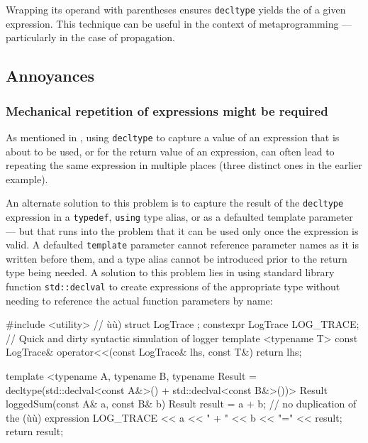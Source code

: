\noindent Wrapping its operand with parentheses ensures \lstinline!decltype! yields
the  of a given expression. This technique can be
useful in the context of metaprogramming --- particularly in the case of
 propagation.

\subsection[Annoyances]{Annoyances}\label{annoyances-decltype}

\subsubsection{Mechanical repetition of expressions might be required}\label{decltype-mechanical}

As mentioned in
,
using \lstinline!decltype! to capture a value of an expression that is about to be used, or for the return value of an expression, can often lead to repeating the same expression in multiple places (three distinct ones in the earlier example).

An alternate solution to this problem is to capture the result of the \lstinline!decltype! expression in a \lstinline!typedef!, \lstinline!using! type alias, or as a defaulted template parameter --- but that runs into the problem that it can be used only once the expression is valid.  A defaulted \lstinline!template! parameter cannot reference parameter names as it is written before them, and a type alias cannot be introduced prior to the return type being needed.  A solution to this problem lies in using standard library function \lstinline!std::declval! to create expressions of the appropriate type without needing to reference the actual function parameters by name:

\begin{emcppshiddenlisting}[emcppsbatch=e11]
#include <utility>  // ù{}ù)
struct LogTrace {};  
constexpr LogTrace LOG_TRACE; // Quick and dirty syntactic simulation of logger
template <typename T>
const LogTrace& operator<<(const LogTrace& lhs, const T&) { return lhs; }
\end{emcppshiddenlisting}
\begin{emcppslisting}[emcppsbatch=e11]
template <typename A, typename B,
          typename Result = decltype(std::declval<const A&>() +
                                     std::declval<const B&>())>
Result loggedSum(const A& a, const B& b)
{
    Result result = a + b;  // no duplication of the (ù{}ù) expression
    LOG_TRACE << a << " + " << b << "=" << result;
    return result;
}
\end{emcppslisting}

